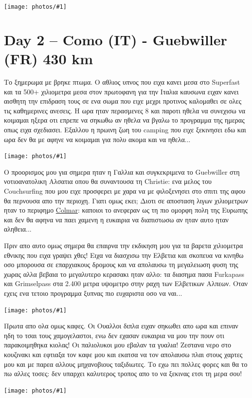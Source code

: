 \documentclass[11pt, letterpaper]{book}
\newcommand\photo[1]{\begin{center}\noindent\texttt{[image: photos/\#1]}\end{center}}
\begin{document}
\photo{18.jpg}

\chapter{Day 2 -- Como (IT) - Guebwiller (FR) 430 km}

Το ξημερωμα με βρηκε πτωμα. Ο αθλιος υπνος που ειχα κανει μεσα στο Superfast και τα 500+ χιλιομετρα μεσα στον πρωτοφανη για την Ιταλια καυσωνα ειχαν κανει αισθητη την επιδραση τους σε ενα σωμα που ειχε μεχρι προτινος καλομαθει σε ολες τις καθημερινες ανεσεις. Η ωρα ηταν περασμενες 8 και παροτι ηθελα να συνεχισω να κοιμαμαι ηξερα οτι επρεπε να σηκωθω αν ηθελα να βγαλω το προγραμμα της ημερας οπως ειχα σχεδιασει. Εξαλλου η πρωινη ζωη του camping που ειχε ξεκινησει εδω και ωρα δεν θα με αφηνε να κοιμαμαι για πολυ ακομα και να ηθελα...

\photo{19.jpg}

Ο προορισμος μου για σημερα ηταν η Γαλλια και συγκεκριμενα το Guebwiller στη νοτιοανατολικη Αλσατια οπου θα συναντουσα τη Christie: ενα μελος του Couchsurfing που μου ειχε προσφερει με χαρα να με φιλοξενησει στο σπιτι της αφου θα περνουσα απο την περιοχη. Γιατι ομως εκει; Διοτι σε αποσταση λιγων χιλιομετρων ηταν το περιφημο \href{http://en.wikipedia.org/wiki/Colmar}{Colmar}: καποιοι το ανεφεραν ως τη πιο ομορφη πολη της Ευρωπης και δεν θα αφηνα να παει χαμενη η ευκαιρια να διαπιστωσω αν ηταν αυτο ηταν αληθεια...

Πριν απο αυτο ομως σημερα θα επαιρνα την εκδικηση μου για τα βαρετα χιλιομετρα εθνικης που ειχα γραψει χθες! Ειχα να διασχισω την Ελβετια και σκοπευα να κινηθω οσο μπορουσα σε επαρχιακους δρομους και να απολαυσω τη μεγαλειωση φυση της χωρας αλλα βεβαια το μεγαλυτερο κερασακι ηταν αλλο: τα διασημα πασα Furkapass και Grimselpass στα 2.400 μετρα υψομετρο στην ραχη των Ελβετικων Αλπεων.
Οταν εχεις ενα τετοιο προγραμμα ξυπνας πιο ευχαριστα οσο να ναι...

\photo{20.jpg}

Πρωτα απο ολα ομως καφες. Οι Ουαλλοι διπλα ειχαν σηκωθει απο ωρα και επιναν ηδη το τσαι τους χαμογελαστοι, ενω δεν εχασαν ευκαιρια να μου την πουν οτι παρακοιμηθηκα κιολας! Οι παλιολυκοι μου εβαλαν τα γυαλια!
Ζεστανα νερο στο κουζινακι και εφτιαξα τον καφε μου και εκατσα να τον απολαυσω πλαι στους χαρτες μου και με παρεα αλλους μηχανοβιους ταξιδιωτες.
Το εχω πει πολλες φορες και θα το πω αλλες τοσες: δεν υπαρχει καλυτερος τροπος απο το να ξεκινας ετσι τη μερα σου!

\photo{21.jpg}
\end{document}
